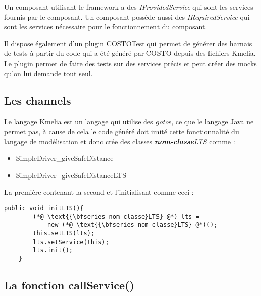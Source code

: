     Un composant utilisant le framework a des \textit{IProvidedService} qui sont les services fournis par le composant. Un composant possède aussi des \textit{IRequiredService} qui sont les services nécessaire pour le fonctionnement du composant.

    Il dispose également d'un plugin COSTOTest qui permet de générer des harnais de tests à partir du code qui a été généré par COSTO depuis des fichiers Kmelia. Le plugin permet de faire des tests sur des services précis et peut créer des mocks qu'on lui demande tout seul. 

\clearpage
\subsection*{Les channels}
\label{subsec:channels}
    Le langage Kmelia est un langage qui utilise des \textit{goto}s, ce que le langage Java ne permet pas, à cause de cela le code généré doit imité cette fonctionnalité du langage de modélisation et donc crée des classes \textit{{\bfseries nom-classe}LTS} comme : 
    \begin{itemize}[label=\textbullet, font=\large]
        \item SimpleDriver\_{}giveSafeDistance
        \item SimpleDriver\_{}giveSafeDistanceLTS
    \end{itemize}
    La première contenant la second et l'initialisant comme ceci :
    

\begin{lstlisting}[frame=single, caption={Initialisation d'un LTS},label=fig:initLTS]
    public void initLTS(){
        (*@ \text{{\bfseries nom-classe}LTS} @*) lts =
            new (*@ \text{{\bfseries nom-classe}LTS} @*)();
        this.setLTS(lts);
        lts.setService(this);
        lts.init();
    }
\end{lstlisting}

\subsection*{La fonction callService()}

